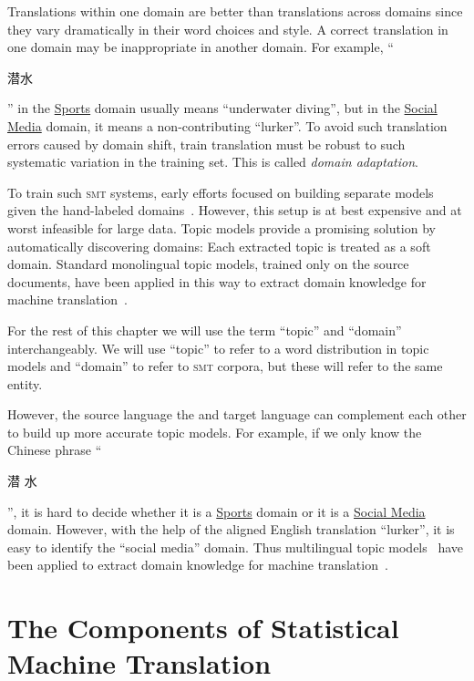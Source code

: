 Translations within one domain are better than translations across
domains since they vary dramatically in their word choices and style.
A correct translation in one domain may be inappropriate in another
domain.  For example, ``\begin{CJK*}{UTF8}{gbsn}潜水\end{CJK*}'' in the
  \underline{Sports} domain usually means ``underwater diving'', but
  in the \underline{Social Media} domain, it means a non-contributing
  ``lurker''. To avoid such translation errors caused by domain
  shift, train translation must be robust to such systematic variation
  in the training set.  This is called \emph{domain adaptation}.

To train such \textsc{smt} systems, early
efforts focused on building separate models given the hand-labeled
domains~\citep{foster-07,matsoukas-09,chiang-11}. However, this setup
is at best expensive and at worst infeasible for large data.  Topic
models provide a promising solution by automatically
discovering domains: Each extracted topic is treated as a soft
domain. 
Standard monolingual topic models, trained only on the source documents, have
been applied in this way to extract domain knowledge for machine
translation~\citep{Eidelman-12}.

For the rest of this chapter we will use the term ``topic'' and
  ``domain'' interchangeably. We will use ``topic'' to refer to  a word distribution in
  topic models and ``domain'' to refer to \textsc{smt} corpora, but these will refer to the same entity. 

However, the source language the and target language can complement
each other to build up more accurate topic models. For example, if we
only know the Chinese phrase ``\begin{CJK*}{UTF8}{gbsn}潜
  水\end{CJK*}'', it is hard to decide whether it is a
  \underline{Sports} domain or it is a \underline{Social Media}
  domain. However, with the help of the aligned English translation
  ``lurker'', it is easy to identify the ``social media'' domain. Thus
  multilingual topic models~\citep{ni-09,DeSmet-09} have been
  applied to extract domain knowledge for machine
  translation~\citep{hu-14}.

\section{The Components of Statistical Machine Translation}

